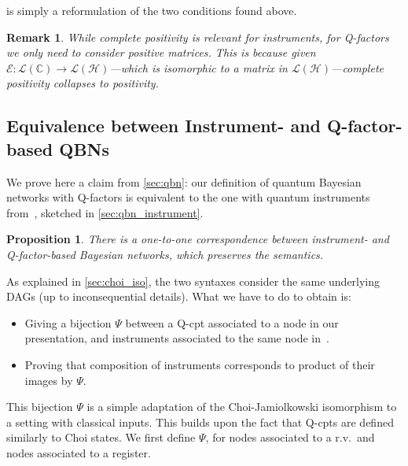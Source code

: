\documentclass[10pt,a4paper]{article}
\renewcommand{\L}{\mathcal{L}}
\newcommand{\Eop}{\mathcal E}
\newcommand*{\C}{\mathbb{C}}
\newcommand{\HH}{\mathcal{H}}
\newcommand{\rv}{r.v.\xspace}
\newcommand*{\qfactor}{Q-factor}
\newcommand*{\Qfactor}{\qfactor}
\newcommand*{\qCPT}{Q-\textsf{cpt}\xspace}
\newcommand*{\qCPTs}{Q-\textsf{cpt}s\xspace}
\newcommand*{\qqbn}{\textsf{QBN}}
\newtheorem{proposition}[theorem]{Proposition}
\newtheorem{remark}[theorem]{Remark}
\begin{document}
 is simply a reformulation of the two conditions found above.

\begin{remark}
While complete positivity is relevant for instruments, for \qfactor s we only need to consider positive matrices.
This is because given $\Eop:\L(\C)\to\L(\HH)$---which is isomorphic to a matrix in $\L(\HH)$---complete positivity collapses to positivity.
\end{remark}

\subsection{Equivalence between Instrument- and \Qfactor-based \qqbn s}
\label{app:equivalence_qbns_proof}

We prove here a claim from \cref{sec:qbn}: our definition of quantum Bayesian networks with \qfactor s is equivalent to the one with quantum instruments from~\cite{GBN2014}, sketched in \cref{sec:qbn_instrument}.

\begin{proposition}
\label{lem:bij_2_QBNs}
There is a one-to-one correspondence between instrument- and \qfactor-based Bayesian networks, which preserves the semantics.
\end{proposition}

As explained in \cref{sec:choi_iso}, the two syntaxes consider the same underlying DAGs (up to inconsequential details).
What we have to do to obtain  is:
\begin{itemize}
\item
Giving a bijection $\Psi$ between a \qCPT associated to a node in our presentation, and instruments associated to the same node in~\cite{GBN2014}.
\item
Proving that composition of instruments corresponds to product of their images by $\Psi$.
\end{itemize}

This bijection $\Psi$ is a simple adaptation of the Choi-Jamiolkowski isomorphism to a setting with classical inputs.
This builds upon the fact that \qCPTs are defined similarly to Choi states.
We first define $\Psi$, for nodes associated to a \rv\ and nodes associated to a register.
\end{document}
